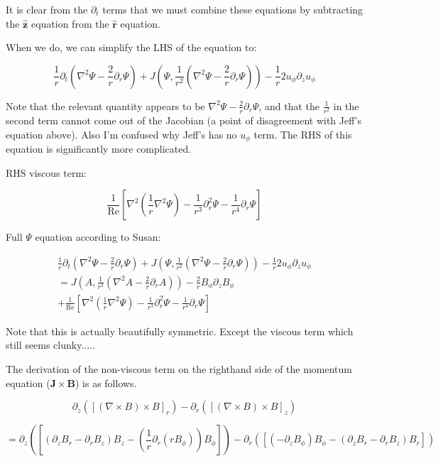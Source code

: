 \documentclass{paper}
\newcommand{\beq}{\begin{equation}}
\newcommand{\eeq}{\end{equation}}
\newcommand{\rhat}{\ensuremath{\mathbf{\hat{r}}}}
\newcommand{\zhat}{\ensuremath{\mathbf{\hat{z}}}}
\newcommand\reye{\mathrm{Re}}
\begin{document}
It is clear from the $\partial_t$ terms that we must combine these equations by subtracting the $\zhat$ equation from the $\rhat$ equation.

When we do, we can simplify the LHS of the equation to:

\beq
\frac{1}{r}\partial_t \left(\nabla^2 \Psi - \frac{2}{r} \partial_r \Psi \right) + J\left(\Psi, \frac{1}{r^2} \left( \nabla^2 \Psi - \frac{2}{r} \partial_r\Psi\right) \right) - \frac{1}{r} 2 u_\phi \partial_z u_\phi
\eeq

Note that the relevant quantity appears to be $\nabla^2 \Psi - \frac{2}{r} \partial_r \Psi$, and that the $\frac{1}{r^2}$ in the second term cannot come out of the Jacobian (a point of disagreement with Jeff's equation above). Also I'm confused why Jeff's has no $u_\phi$ term. The RHS of this equation is significantly more complicated.

RHS viscous term:

\beq
\frac{1}{\reye} \left[ \nabla^2 \left(\frac{1}{r} \nabla^2 \Psi\right) - \frac{1}{r^3} \partial_r^2 \Psi - \frac{1}{r^4}\partial_r\Psi\right]
\eeq

Full $\Psi$ equation according to Susan:

\begin{multline}
\label{eq:Psi_unperturbed}
\frac{1}{r}\partial_t \left(\nabla^2 \Psi - \frac{2}{r} \partial_r \Psi \right) + J\left(\Psi, \frac{1}{r^2} \left( \nabla^2 \Psi - \frac{2}{r} \partial_r\Psi\right) \right) - \frac{1}{r} 2 u_\phi \partial_z u_\phi \\
= J\left(A, \frac{1}{r^2} \left( \nabla^2 A - \frac{2}{r} \partial_rA\right) \right) - \frac{2}{r}B_\phi \partial_z B_\phi \\
+ \frac{1}{\reye} \left[ \nabla^2 \left(\frac{1}{r} \nabla^2 \Psi\right) - \frac{1}{r^3} \partial_r^2 \Psi - \frac{1}{r^4}\partial_r\Psi\right]
\end{multline}

Note that this is actually beautifully symmetric. Except the viscous term which still seems clunky.....

The derivation of the non-viscous term on the righthand side of the momentum equation ($\mathbf{J} \times \mathbf{B}$) is as follows. 

\beq
\partial_z\left(\left[\left(\nabla \times B \right) \times B \right]_r\right) - \partial_r \left(\left[\left(\nabla \times B\right) \times B \right]_z\right)
\eeq

\beq
= \partial_z\left(\left[\left(\partial_z B_r - \partial_r B_z \right) B_z - \left(\frac{1}{r}\partial_r\left(r B_\phi\right)\right) B_\phi \right] \right) - \partial_r \left(\left[\left(-\partial_z B_\phi\right)B_\phi - \left(\partial_z B_r - \partial_r B_z \right) B_r\right]\right)
\eeq
\end{document}

